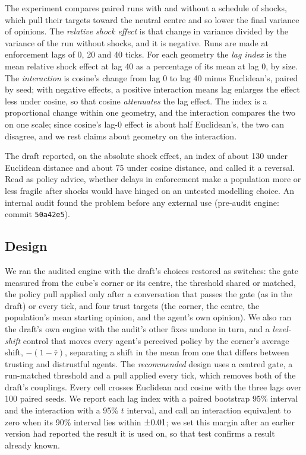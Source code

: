 \documentclass[11pt]{article}
\begin{document}
The experiment compares paired runs with and without a schedule of shocks, which pull their targets toward the neutral centre and so lower the final variance of opinions.
The \emph{relative shock effect} is that change in variance divided by the variance of the run without shocks, and it is negative.
Runs are made at enforcement lags of 0, 20 and 40 ticks.
For each geometry the \emph{lag index} is the mean relative shock effect at lag 40 as a percentage of its mean at lag 0, by size.
The \emph{interaction} is cosine's change from lag 0 to lag 40 minus Euclidean's, paired by seed; with negative effects, a positive interaction means lag enlarges the effect less under cosine, so that cosine \emph{attenuates} the lag effect.
The index is a proportional change within one geometry, and the interaction compares the two on one scale; since cosine's lag-0 effect is about half Euclidean's, the two can disagree, and we rest claims about geometry on the interaction.

The draft reported, on the absolute shock effect, an index of about 130 under Euclidean distance and about 75 under cosine distance, and called it a reversal.
Read as policy advice, whether delays in enforcement make a population more or less fragile after shocks would have hinged on an untested modelling choice.
An internal audit found the problem before any external use (pre-audit engine: commit \texttt{50a42e5}).

\subsection{Design}
We ran the audited engine with the draft's choices restored as switches: the gate measured from the cube's corner or its centre, the threshold shared or matched, the policy pull applied only after a conversation that passes the gate (as in the draft) or every tick, and four trust targets (the corner, the centre, the population's mean starting opinion, and the agent's own opinion).
We also ran the draft's own engine with the audit's other fixes undone in turn, and a \emph{level-shift} control that moves every agent's perceived policy by the corner's average shift, $-(1-\bar\tau)$, separating a shift in the mean from one that differs between trusting and distrustful agents.
The \emph{recommended} design uses a centred gate, a run-matched threshold and a pull applied every tick, which removes both of the draft's couplings.
Every cell crosses Euclidean and cosine with the three lags over 100 paired seeds.
We report each lag index with a paired bootstrap 95\% interval and the interaction with a 95\% $t$ interval, and call an interaction equivalent to zero when its 90\% interval lies within $\pm0.01$; we set this margin after an earlier version had reported the result it is used on, so that test confirms a result already known.
\end{document}
